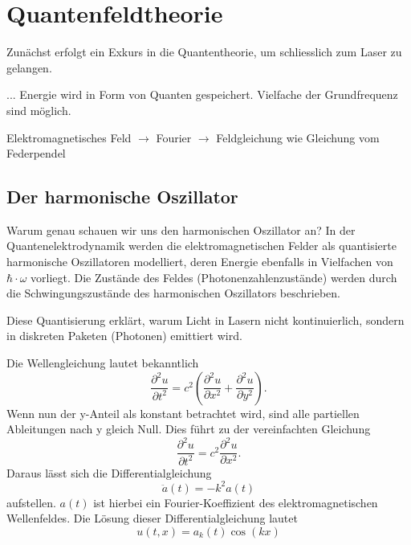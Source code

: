 %
%
%
%
\section{Quantenfeldtheorie
\label{fourier:section:quantenfeldtheorie}}
Zunächst erfolgt ein Exkurs in die Quantentheorie, um schliesslich zum Laser zu gelangen. %

...
Energie wird in Form von Quanten gespeichert.
Vielfache der Grundfrequenz sind möglich.

Elektromagnetisches Feld $\rightarrow$ Fourier $\rightarrow$ Feldgleichung wie Gleichung vom Federpendel

\subsection{Der harmonische Oszillator
\label{fourier:subsection:derHarmonischeOszillator}}
Warum genau schauen wir uns den harmonischen Oszillator an?
In der Quantenelektrodynamik werden die elektromagnetischen Felder als quantisierte harmonische Oszillatoren modelliert, deren Energie ebenfalls in Vielfachen von $\hbar\cdot\omega$ vorliegt.
Die Zustände des Feldes (Photonenzahlenzustände) werden durch die Schwingungszustände des harmonischen Oszillators beschrieben.

Diese Quantisierung erklärt, warum Licht in Lasern nicht kontinuierlich, sondern in diskreten Paketen (Photonen) emittiert wird. %

Die Wellengleichung lautet bekanntlich
\begin{equation}
    \frac{\partial^2 u}{\partial t^2} = c^2 \left( \frac{\partial^2 u}{\partial x^2} + \frac{\partial^2 u}{\partial y^2} \right).
\end{equation}
Wenn nun der y-Anteil als konstant betrachtet wird, sind alle partiellen Ableitungen nach y gleich Null.
Dies führt zu der vereinfachten Gleichung
\begin{equation}
    \frac{\partial^2 u}{\partial t^2} = c^2 \frac{\partial^2 u}{\partial x^2}.
\end{equation}
Daraus lässt sich die Differentialgleichung
\begin{equation}
    \ddot{a}(t) = -k^2 a(t)
\end{equation}
aufstellen.
$a(t)$ ist hierbei ein Fourier-Koeffizient des elektromagnetischen Wellenfeldes.
Die Lösung dieser Differentialgleichung lautet
\begin{equation}
    u(t,x) = a_k(t) \cos(kx)
\end{equation}

